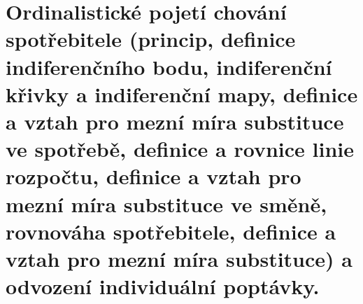 \clearpage
\section{Ordinalistické pojetí chování spotřebitele (princip, definice indiferenčního bodu,
indiferenční křivky a indiferenční mapy, definice a vztah pro mezní míra substituce ve
spotřebě, definice a rovnice linie rozpočtu, definice a vztah pro mezní míra substituce
ve směně, rovnováha spotřebitele, definice a vztah pro mezní míra substituce) a
odvození individuální poptávky.}